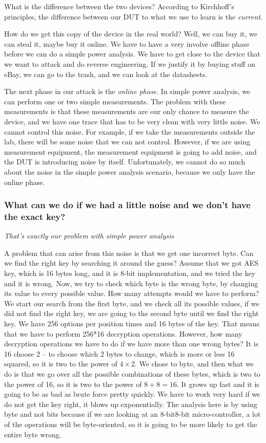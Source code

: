 What is the difference between the two devices? 
According to Kirchhoff's principles, the difference between our DUT to what we use to learn is the \textit{current}. 
  
How do we get this copy of the device in the real world?
Well, we can buy it, we can steal it, maybe buy it online. 
We have to have a very involve offline phase before we can do a simple power analysis.
We have to get close to the device that we want to attack and do reverse engineering.
If we justify it by buying stuff on eBay, we can go to the trash, and we can look at the datasheets.

The next phase in our attack is the \textit{online phase}. 
In simple power analysis, we can perform one or two simple measurements.
The problem with these measurements is that these measurements are our only chance to measure the device, and we have one trace that has to be very clean with very little noise. 
We cannot control this noise.
For example, if we take the measurements outside the lab, there will be some noise that we can not control. 
However, if we are using measurement equipment, the measurement equipment is going to add noise, and the DUT is introducing noise by itself.
Unfortunately, we cannot do so much about the noise in the simple power analysis scenario, because we only have the online phase.

\subsubsection{What can we do if we had a little noise and we don't have the exact key?}

\textit{That's exactly our problem with simple power analysis}

A problem that can arise from this noise is that we get one incorrect byte.
Can we find the right key by searching it around the guess?
Assume that we got AES key, which is 16 bytes long, and it is 8-bit implementation, and we tried the key and it is wrong.
Now, we try to check which byte is the wrong byte, by changing its value to every possible value.
How many attempts would we have to perform?
We start our search from the first byte, and we check all its possible values, if we did not find the right key, we are going to the second byte until we find the right key.
We have 256 options per position times and 16 bytes of the key.
That means that we have to perform 256*16 decryption operations.
However, how many decryption operations we have to do if we have more than one wrong bytes?
It is 16 choose 2 – to choose which 2 bytes to change, which is more or less 16 squared, so it is two to the power of $4\times2$.
We chose to byte, and then what we do is that we go over all the possible combinations of these bytes, which is two to the power of 16, so it is two to the power of $8+8=16$.
It grows up fast and it is going to be as bad as brute force pretty quickly.
We have to work very hard if we do not get the key right, it blows up exponentially.
The analysis here is by using byte and not bits because if we are looking at an 8-bit8-bit micro-controller, a lot of the operations will be byte-oriented, so it is going to be more likely to get the entire byte wrong.

